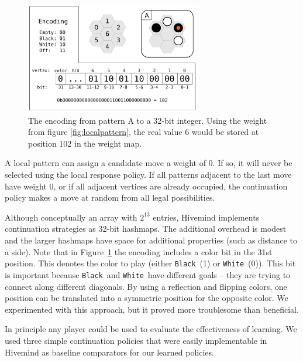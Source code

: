 \documentclass{acm_proc_article-sp}
\newcommand{\hblack}{\texttt{Black}}
\newcommand{\hwhite}{\texttt{White}}
\begin{document}
\begin{figure}
	\begin{center}
	\includegraphics[width=3.0in]{graphics/weight-pattern-map.pdf}
	\caption{The encoding from pattern A to a 32-bit integer. Using the weight from figure \ref{fig:localpattern}, the real value 6 would be stored at position 102 in the weight map.}
	\label{fig:encoding}
	\end{center}
\end{figure}

A local pattern can assign a candidate move a weight of 0. If so, it will never be selected using the local response policy. 
If all patterns adjacent to the last move have weight 0, or if all adjacent vertices are already occupied, 
the continuation policy makes a move at random from all legal possibilities.

Although conceptually an array with $2^{13}$ entries, Hivemind implements continuation strategies as
32-bit hashmaps.  
The additional overhead is modest and the larger hashmaps  have space for additional properties (such as distance to a side).
Note that in Figure~\ref{fig:encoding} the encoding includes a color bit in the 31st position. This denotes the color to play (either \hblack\ (1) or \hwhite\ (0)). 
This bit is important because \hblack\ and \hwhite\ have different goals -- they are trying to connect along different diagonals. 
By using a reflection and flipping colors, one position can be translated into a symmetric  position for the opposite color. 
We experimented with this approach, but it proved more troublesome than beneficial.


In principle any player could be used to evaluate the effectiveness of learning.   We used three simple continuation policies that were easily implementable in Hivemind as baseline comparators for our learned policies.
\end{document}
